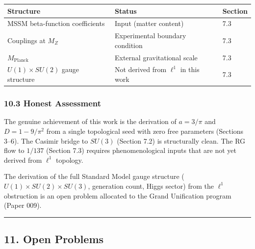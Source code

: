 \documentclass[
]{article}
\begin{document}
\begin{longtable}[]{@{}lll@{}}
\toprule
Structure & Status & Section\tabularnewline
\midrule
\endhead
MSSM beta-function coefficients & Input (matter content) &
7.3\tabularnewline
Couplings at \(M_Z\) & Experimental boundary condition &
7.3\tabularnewline
\(M_{\mathrm{Planck}}\) & External gravitational scale &
7.3\tabularnewline
\(U(1) \times SU(2)\) gauge structure & Not derived from \(\ell^1\) in
this work & 7.3\tabularnewline
\bottomrule
\end{longtable}

\hypertarget{honest-assessment}{%
\subsubsection{10.3 Honest Assessment}\label{honest-assessment}}

The genuine achievement of this work is the derivation of \(a = 3/\pi\)
and \(D = 1 - 9/\pi^2\) from a single topological seed with zero free
parameters (Sections 3--6). The Casimir bridge to \(SU(3)\) (Section
7.2) is structurally clean. The RG flow to \(1/137\) (Section 7.3)
requires phenomenological inputs that are not yet derived from
\(\ell^1\) topology.

The derivation of the full Standard Model gauge structure
(\(U(1) \times SU(2) \times SU(3)\), generation count, Higgs sector)
from the \(\ell^1\) obstruction is an open problem allocated to the
Grand Unification program (Paper 009).

\begin{center}\rule{0.5\linewidth}{0.5pt}\end{center}

\hypertarget{open-problems}{%
\subsection{11. Open Problems}\label{open-problems}}
\end{document}

